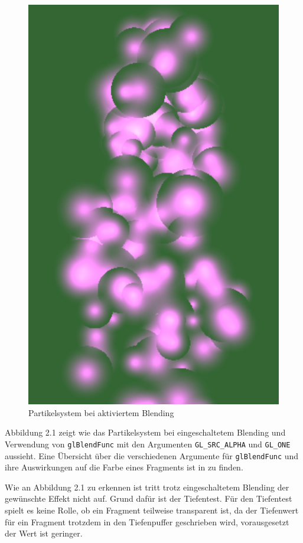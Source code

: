 \begin{figure}[h]
\centering
\includegraphics[scale=0.4]{bilder/BlendingEnabled}
\caption{Partikelsystem bei aktiviertem Blending}
\label{fig:BlendingEnabled}
\end{figure}

Abbildung 2.1 zeigt wie das Partikelsystem bei eingeschaltetem Blending und Verwendung von {\texttt{glBlendFunc}} mit den Argumenten {\texttt{GL\_SRC\_ALPHA}} und {\texttt{GL\_ONE}} aussieht. Eine Übersicht über die verschiedenen Argumente für {\texttt{glBlendFunc}} und ihre Auswirkungen auf die Farbe eines Fragments ist in \cite{virag:2012} zu finden.

Wie an Abbildung 2.1 zu erkennen ist tritt trotz eingeschaltetem Blending der gewünschte Effekt nicht auf. Grund dafür ist der Tiefentest. Für den Tiefentest spielt es keine Rolle, ob ein Fragment teilweise transparent ist, da der Tiefenwert für ein Fragment trotzdem in den Tiefenpuffer geschrieben wird, vorausgesetzt der Wert ist geringer.

